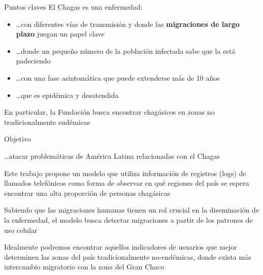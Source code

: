 \documentclass{beamer}
\begin{document}
\begin{frame}{Puntos claves}
	El Chagas es una enfermedad:
	\begin{itemize}
		\item \ldots con diferentes vías de transmisión y donde las \textbf{migraciones de largo plazo} juegan un papel clave
		\item \ldots donde un pequeño número de la población infectada sabe que la está padeciendo
		\item \ldots con una fase asintomática que puede extenderse más de 10 años
		\item \ldots que es epidémica y desatendida
	\end{itemize}
	En particular, la Fundación busca encontrar chagásicos en zonas no tradicionalmente endémicas
\end{frame}


\begin{frame}{Objetivo}
	\begin{block}{\ldots atacar problemáticas de América Latina relacionadas con el Chagas}

	Este trabajo propone un modelo que utiliza información de registros (logs) de llamados telefónicos
	como forma de observar en qué regiones del país se espera encontrar una alta proporción de personas chagásicas

	\bigskip
	Sabiendo que las migraciones humanas tienen un rol crucial en la diseminación de la enfermedad, el modelo busca
	detectar migraciones a partir de los patrones de uso celular

	\bigskip
	Idealmente podremos encontrar aquellos indicadores de usuarios que mejor determinen las zonas del país tradicionalmente no-endémicas, donde exista más intercambio migratorio con la zona del Gran Chaco
	\end{block}
\end{frame}
\end{document}
